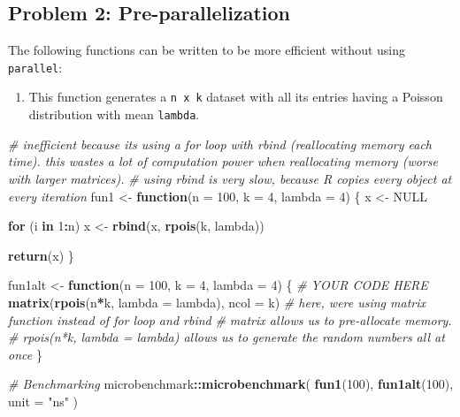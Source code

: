 \documentclass[
]{article}
\newenvironment{Shaded}{\begin{snugshade}}{\end{snugshade}}
\newcommand{\AttributeTok}[1]{\textcolor[rgb]{0.13,0.29,0.53}{#1}}
\newcommand{\CommentTok}[1]{\textcolor[rgb]{0.56,0.35,0.01}{\textit{#1}}}
\newcommand{\ConstantTok}[1]{\textcolor[rgb]{0.56,0.35,0.01}{#1}}
\newcommand{\ControlFlowTok}[1]{\textcolor[rgb]{0.13,0.29,0.53}{\textbf{#1}}}
\newcommand{\DecValTok}[1]{\textcolor[rgb]{0.00,0.00,0.81}{#1}}
\newcommand{\FunctionTok}[1]{\textcolor[rgb]{0.13,0.29,0.53}{\textbf{#1}}}
\newcommand{\NormalTok}[1]{#1}
\newcommand{\OtherTok}[1]{\textcolor[rgb]{0.56,0.35,0.01}{#1}}
\newcommand{\SpecialCharTok}[1]{\textcolor[rgb]{0.81,0.36,0.00}{\textbf{#1}}}
\newcommand{\StringTok}[1]{\textcolor[rgb]{0.31,0.60,0.02}{#1}}
\providecommand{\tightlist}{%
  \setlength{\itemsep}{0pt}\setlength{\parskip}{0pt}}
\begin{document}
\subsection{Problem 2:
Pre-parallelization}\label{problem-2-pre-parallelization}

The following functions can be written to be more efficient without
using \texttt{parallel}:

\begin{enumerate}
\def\labelenumi{\arabic{enumi}.}
\tightlist
\item
  This function generates a \texttt{n\ x\ k} dataset with all its
  entries having a Poisson distribution with mean \texttt{lambda}.
\end{enumerate}

\begin{Shaded}
\begin{Highlighting}[]
\CommentTok{\# inefficient because it\textquotesingle{}s using a for loop with rbind (reallocating memory each time). this wastes a lot of computation power when reallocating memory (worse with larger matrices). }
\CommentTok{\# using rbind is very slow, because R copies every object at every iteration }
\NormalTok{fun1 }\OtherTok{\textless{}{-}} \ControlFlowTok{function}\NormalTok{(}\AttributeTok{n =} \DecValTok{100}\NormalTok{, }\AttributeTok{k =} \DecValTok{4}\NormalTok{, }\AttributeTok{lambda =} \DecValTok{4}\NormalTok{) \{}
\NormalTok{  x }\OtherTok{\textless{}{-}} \ConstantTok{NULL}
  
  \ControlFlowTok{for}\NormalTok{ (i }\ControlFlowTok{in} \DecValTok{1}\SpecialCharTok{:}\NormalTok{n)}
\NormalTok{    x }\OtherTok{\textless{}{-}} \FunctionTok{rbind}\NormalTok{(x, }\FunctionTok{rpois}\NormalTok{(k, lambda))}
  
  \FunctionTok{return}\NormalTok{(x)}
\NormalTok{\}}

\NormalTok{fun1alt }\OtherTok{\textless{}{-}} \ControlFlowTok{function}\NormalTok{(}\AttributeTok{n =} \DecValTok{100}\NormalTok{, }\AttributeTok{k =} \DecValTok{4}\NormalTok{, }\AttributeTok{lambda =} \DecValTok{4}\NormalTok{) \{}
  \CommentTok{\# YOUR CODE HERE}
  \FunctionTok{matrix}\NormalTok{(}\FunctionTok{rpois}\NormalTok{(n}\SpecialCharTok{*}\NormalTok{k, }\AttributeTok{lambda =}\NormalTok{ lambda), }\AttributeTok{ncol =}\NormalTok{ k)}
  \CommentTok{\# here, we\textquotesingle{}re using matrix function instead of for loop and rbind}
  \CommentTok{\# matrix allows us to pre{-}allocate memory. }
  \CommentTok{\# rpois(n*k, lambda = lambda) allows us to generate the random numbers all at once }
\NormalTok{\}}

\CommentTok{\# Benchmarking}
\NormalTok{microbenchmark}\SpecialCharTok{::}\FunctionTok{microbenchmark}\NormalTok{(}
  \FunctionTok{fun1}\NormalTok{(}\DecValTok{100}\NormalTok{),}
  \FunctionTok{fun1alt}\NormalTok{(}\DecValTok{100}\NormalTok{),}
  \AttributeTok{unit =} \StringTok{"ns"}
\NormalTok{)}
\end{Highlighting}
\end{Shaded}
\end{document}
